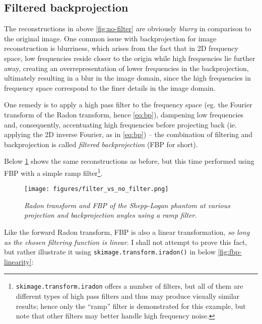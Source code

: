 \subsection{Filtered backprojection}

The reconstructions in above \cref{fig:no-filter} are obviously \textit{blurry} in
comparison to the original image. One common issue with backprojection for image
reconstruction is blurriness, which arises from the fact that in 2D frequency space,
low frequencies reside closer to the origin while high frequencies lie further
away, creating an overrepresentation of lower frequencies in the backprojection,
ultimately resulting in a blur in the image domain, since the high frequencies
in frequency space correspond to the finer details in the image
domain\cite{toft}.

One remedy is to apply a high pass filter to the frequency space (eg. the
Fourier transform of the Radon transform, hence \cref{eq:bp}), dampening low
frequencies and, consequently, accentuating high frequencies before projecting
back (ie. applying the 2D inverse Fourier, as in \cref{eq:bp}) -- the
combination of filtering and backprojection is called \textit{filtered
backprojection} (FBP for short).

\medskip

Below \cref{fig:filter} shows the same reconstructions as before, but
this time performed using FBP with a simple ramp
filter\footnote{\texttt{skimage.transform.iradon} offers a number of filters,
but all of them are different types of high pass filters and thus may produce visually similar
results; hence only the ``ramp'' filter is demonstrated for this example, but
note that other filters may better handle high frequency noise.}.

\begin{figure}[H]
  \centering
  \texttt{[image: figures/filter\_vs\_no\_filter.png]}
  \vspace{-0.2cm}
  \caption{\small \textit{Radon transform and FBP of the Shepp-Logan phantom at
  various projection and backprojection angles using a ramp filter.}}
\label{fig:filter}
\end{figure}


Like the forward Radon transform, FBP is also a linear transformation,
\textit{so long as the chosen filtering function is linear}. I shall not attempt
to prove this fact, but rather illustrate it using
\texttt{skimage.transform.iradon()} in below \cref{fig:fbp-linearity}:

